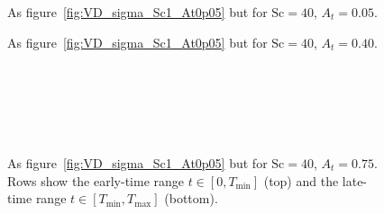 \clearpage
\begin{figure}[p]
  \centering
  \caption{As figure~\ref{fig:VD_sigma_Sc1_At0p05} but for $\mathrm{Sc}=40$, $A_t=0.05$.}
  \label{fig:VD_sigma_Sc40_At0p05}
\end{figure}
\clearpage
\begin{figure}[p]
  \centering
  \caption{As figure~\ref{fig:VD_sigma_Sc1_At0p05} but for $\mathrm{Sc}=40$, $A_t=0.40$.}
  \label{fig:VD_sigma_Sc40_At0p40}
\end{figure}
\clearpage
\begin{figure}[p]
  \centering
  \begin{minipage}[t]{0.32\linewidth}\centering
    \\[2pt]
    
  \end{minipage}\hfill
  \begin{minipage}[t]{0.32\linewidth}\centering
    \\[2pt]
    
  \end{minipage}\hfill
  \begin{minipage}[t]{0.32\linewidth}\centering
    \\[2pt]
    
  \end{minipage}
  \caption{As figure~\ref{fig:VD_sigma_Sc1_At0p05} but for $\mathrm{Sc}=40$, $A_t=0.75$.
           Rows show the early-time range $t\in[0,T_{\min}]$ (top) and the late-time range
           $t\in[T_{\min},T_{\max}]$ (bottom).}
  \label{fig:VD_sigma_Sc40_At0p75}
\end{figure}
